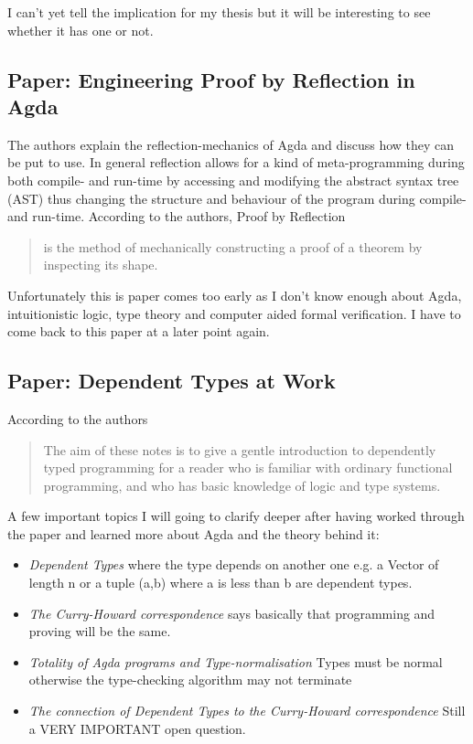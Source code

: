 I can't yet tell the implication for my thesis but it will be interesting to see whether it has one or not.

\subsection*{Paper: Engineering Proof by Reflection in Agda \cite{vanderWalt2013}}
The authors explain the reflection-mechanics of Agda and discuss how they can be put to use.
In general reflection allows for a kind of meta-programming during both compile- and run-time by accessing and modifying the abstract syntax tree (AST) thus changing the structure and behaviour of the program during compile- and run-time. According to the authors, Proof by Reflection
\begin{quote}
is the method of mechanically constructing a proof of a theorem by inspecting its shape.
\end{quote}

Unfortunately this is paper comes too early as I don't know enough about Agda, intuitionistic logic, type theory and computer aided formal verification. I have to come back to this paper at a later point again.

\subsection*{Paper: Dependent Types at Work \cite{Bove2009}}
According to the authors

\begin{quote}
The aim of these notes is to give a gentle introduction to dependently typed programming for a reader who is familiar with ordinary functional programming, and who has basic knowledge of logic and type systems.
\end{quote}

A few important topics I will going to clarify deeper after having worked through the paper and learned more about Agda and the theory behind it:

\begin{itemize}
\item \textit{Dependent Types} where the type depends on another one e.g. a Vector of length n or a tuple (a,b) where a is less than b are dependent types.
\item \textit{The Curry-Howard correspondence} says basically that programming and proving will be the same.
\item \textit{Totality of Agda programs and Type-normalisation} Types must be normal otherwise the type-checking algorithm may not terminate
\item \textit{The connection of Dependent Types to the Curry-Howard correspondence} Still a VERY IMPORTANT open question.
\end{itemize}

